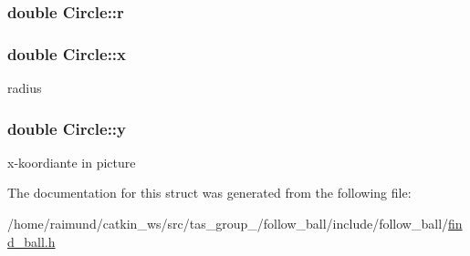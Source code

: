 \subsubsection[{r}]{\setlength{\rightskip}{0pt plus 5cm}double Circle\+::r}\label{struct_circle_a1e492090654899b1b52902b875a431b6}
\hypertarget{struct_circle_afb78bb3d13fde2c40e5d4ac1626b0e5b}{}
\subsubsection[{x}]{\setlength{\rightskip}{0pt plus 5cm}double Circle\+::x}\label{struct_circle_afb78bb3d13fde2c40e5d4ac1626b0e5b}


radius 

\hypertarget{struct_circle_ac2027738070be7ef3c86f100307c3501}{}
\subsubsection[{y}]{\setlength{\rightskip}{0pt plus 5cm}double Circle\+::y}\label{struct_circle_ac2027738070be7ef3c86f100307c3501}


x-\/koordiante in picture 



The documentation for this struct was generated from the following file\+:\begin{DoxyCompactItemize}
\item 
/home/raimund/catkin\+\_\+ws/src/tas\+\_\+group\+\_/follow\+\_\+ball/include/follow\+\_\+ball/\hyperlink{find__ball_8h}{find\+\_\+ball.\+h}\end{DoxyCompactItemize}
